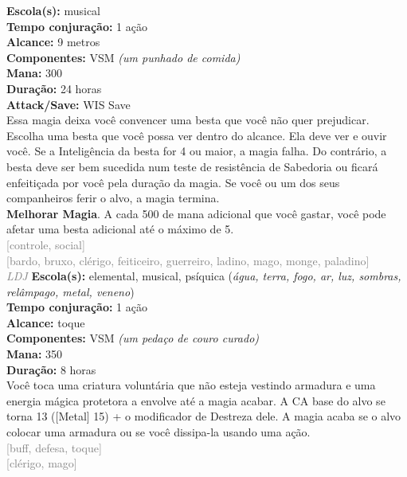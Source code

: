 \documentclass{RPG_Adventure}[2021/10/20]
\begin{document}
{\small \t \textbf{Escola(s):} musical\\\t \textbf{Tempo conjuração:} 1 ação\\\t \textbf{Alcance:} 9 metros\\\t \textbf{Componentes:} VSM \textit{(um punhado de comida)}\\\t \textbf{Mana:} 300\\\t \textbf{Duração:} 24 horas\\\t \textbf{Attack/Save:} WIS Save\\}
{\normalsize Essa magia deixa você convencer uma besta que você não quer prejudicar. Escolha uma besta que você possa ver dentro do alcance. Ela deve ver e ouvir você. Se a Inteligência da besta for 4 ou maior, a magia falha. Do contrário, a besta deve ser bem sucedida num teste de resistência de Sabedoria ou ficará enfeitiçada por você pela duração da magia. Se você ou um dos seus companheiros ferir o alvo, a magia termina.\\\t \textbf{Melhorar Magia}. A cada 500 de mana adicional que você gastar, você pode afetar uma besta adicional até o máximo de 5.\\}
{\scriptsize \textcolor{gray}{[controle, social]\\}}
{\scriptsize \textcolor{gray}{[bardo, bruxo, clérigo, feiticeiro, guerreiro, ladino, mago, monge, paladino]\\}}
{\tiny \textcolor{gray}{\textit{LDJ}}}
{\small \t \textbf{Escola(s):} elemental, musical, psíquica (\textit{água, terra, fogo, ar, luz, sombras, relâmpago, metal, veneno})\\\t \textbf{Tempo conjuração:} 1 ação\\\t \textbf{Alcance:} toque\\\t \textbf{Componentes:} VSM \textit{(um pedaço de couro curado)}\\\t \textbf{Mana:} 350\\\t \textbf{Duração:} 8 horas\\}
{\normalsize Você toca uma criatura voluntária que não esteja vestindo armadura e uma energia mágica protetora a envolve até a magia acabar. A CA base do alvo se torna 13 ([Metal] 15) + o modificador de Destreza dele. A magia acaba se o alvo colocar uma armadura ou se você dissipa-la usando uma ação.\\}
{\scriptsize \textcolor{gray}{[buff, defesa, toque]\\}}
{\scriptsize \textcolor{gray}{[clérigo, mago]\\}}
\end{document}
